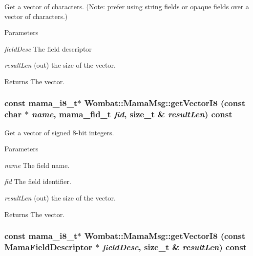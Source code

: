 Get a vector of characters. (Note: prefer using string fields or opaque fields over a vector of characters.) 
\begin{DoxyParams}{Parameters}
\item[{\em fieldDesc}]The field descriptor \item[{\em resultLen}](out) the size of the vector. \end{DoxyParams}
\begin{DoxyReturn}{Returns}
The vector. 
\end{DoxyReturn}
\hypertarget{classWombat_1_1MamaMsg_af5ded730cd2b71b03663d58813a072d6}{
\subsubsection[{getVectorI8}]{\setlength{\rightskip}{0pt plus 5cm}const mama\_\-i8\_\-t$\ast$ Wombat::MamaMsg::getVectorI8 (const char $\ast$ {\em name}, \/  mama\_\-fid\_\-t {\em fid}, \/  size\_\-t \& {\em resultLen}) const}}
\label{classWombat_1_1MamaMsg_af5ded730cd2b71b03663d58813a072d6}


Get a vector of signed 8-\/bit integers. 
\begin{DoxyParams}{Parameters}
\item[{\em name}]The field name. \item[{\em fid}]The field identifier. \item[{\em resultLen}](out) the size of the vector. \end{DoxyParams}
\begin{DoxyReturn}{Returns}
The vector. 
\end{DoxyReturn}
\hypertarget{classWombat_1_1MamaMsg_af8e3ac71ac6ca40bbc04525bd8979880}{
\subsubsection[{getVectorI8}]{\setlength{\rightskip}{0pt plus 5cm}const mama\_\-i8\_\-t$\ast$ Wombat::MamaMsg::getVectorI8 (const {\bf MamaFieldDescriptor} $\ast$ {\em fieldDesc}, \/  size\_\-t \& {\em resultLen}) const}}
\label{classWombat_1_1MamaMsg_af8e3ac71ac6ca40bbc04525bd8979880}


